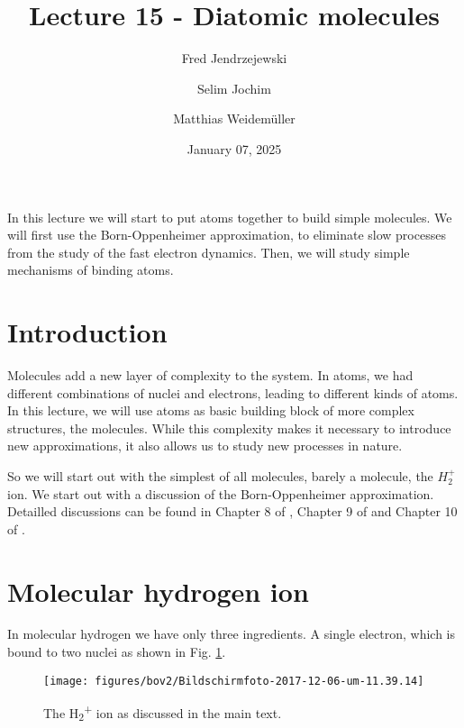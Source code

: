 \documentclass[10pt]{article}
\let\cite\citep
\renewenvironment{abstract}
  {{\bfseries\noindent{\abstractname}\par\nobreak}\footnotesize}
  {\bigskip}
\providecommand\citep{\cite}
\begin{document}
\title{Lecture 15 - Diatomic molecules}



\author[1]{Fred Jendrzejewski}%
\author[2]{Selim Jochim}%
\author[2]{Matthias Weidemüller}%
%
%


\vspace{-1em}



  
  \date{January 07, 2025}


\begingroup
\let\center\flushleft
\let\endcenter\endflushleft
\maketitle
\endgroup





\begin{abstract}
In this lecture we will start to put atoms together to build simple molecules. We will first use the Born-Oppenheimer approximation, to eliminate slow processes from the study of the fast electron dynamics. Then, we will study simple mechanisms of binding atoms.%
\end{abstract}%



\sloppy


\section{Introduction}

Molecules add a new layer of complexity to the system. In atoms, we had different combinations of nuclei and electrons, leading to different kinds of atoms. In this lecture, we will use atoms as basic building block of more complex structures, the molecules. While this complexity makes it necessary to introduce new approximations, it also allows us to study new processes in nature. 

So we will start out with the simplest of all molecules, barely a molecule, the $H_2^+$ ion. We start out with a discussion of the Born-Oppenheimer approximation. Detailled discussions can be found in Chapter 8 of \cite{atkins1997molecular}, Chapter 9 of \cite{Demtr_der_2010} and Chapter 10 of \cite{bransden2003physics}. 

\section{Molecular hydrogen ion}
In molecular hydrogen we have only three ingredients. A single electron, which is bound to two nuclei as shown in Fig. \ref{547852}.
\begin{figure}[h!]
\begin{center}
\texttt{[image: figures/bov2/Bildschirmfoto-2017-12-06-um-11.39.14]}
\caption{{The H\textsubscript{2}\textsuperscript{+} ion as discussed in the main
text.
{\label{547852}}%
}}
\end{center}
\end{figure}
\end{document}
